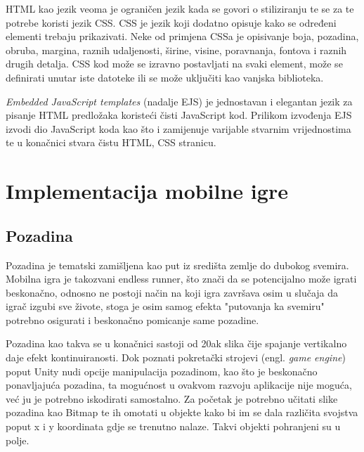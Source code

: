 \documentclass[times, utf8, zavrsni]{fer}
\begin{document}
	HTML kao jezik veoma je ograničen jezik kada se govori o stiliziranju te se za te potrebe koristi jezik CSS. CSS je jezik koji dodatno opisuje kako se određeni elementi trebaju prikazivati. Neke od primjena CSSa je opisivanje boja, pozadina, obruba,
	margina, raznih udaljenosti, širine, visine, poravnanja, fontova i raznih drugih detalja. CSS kod može se izravno postavljati na svaki element, može se definirati unutar iste datoteke ili se može uključiti kao vanjska biblioteka. 
	
	\textit{Embedded JavaScript templates} (nadalje EJS) je jednostavan i elegantan jezik za pisanje HTML predložaka koristeći čisti JavaScript kod. Prilikom izvođenja EJS izvodi dio JavaScript koda kao što i zamijenuje varijable stvarnim vrijednostima te
	u konačnici stvara čistu HTML, CSS stranicu.
	

	

\chapter{Implementacija mobilne igre}

	\section{Pozadina}
	Pozadina je tematski zamišljena kao put iz središta zemlje  do dubokog svemira. Mobilna igra je takozvani endless runner, što znači da se potencijalno može igrati beskonačno,
	odnosno ne postoji način na koji igra završava osim u slučaja da igrač izgubi sve živote, stoga je osim samog efekta "putovanja ka svemiru" potrebno osigurati i beskonačno pomicanje same pozadine.
	
	Pozadina kao takva se u konačnici sastoji od 20ak slika čije spajanje vertikalno daje efekt kontinuiranosti. Dok poznati pokretački strojevi (engl. \textit{game engine}) poput Unity nudi opcije manipulacija
	pozadinom, kao što je beskonačno ponavljajuća pozadina, ta mogućnost u ovakvom razvoju aplikacije nije moguća, već ju je potrebno iskodirati samostalno. 
	Za početak je potrebno učitati slike pozadina kao Bitmap te ih omotati u objekte kako bi im se dala različita svojstva poput x i y koordinata gdje se trenutno nalaze. Takvi objekti pohranjeni su u polje.
	
\end{document}
